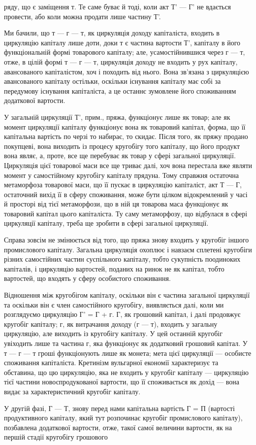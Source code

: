 ряду, що є заміщення т. Те саме буває й тоді, коли акт Т' — Г' не
вдається провести, або коли можна продати лише частину Т'.

Ми бачили, що т — г — т, як циркуляція доходу капіталіста, входить
в циркуляцію капіталу лише доти, доки т є частина вартости Т', капіталу
в його функціональній формі товарового капіталу; але, усамостійнившися
через г — т, отже, в цілій формі т — г — т, циркуляція доходу не входить
у рух капіталу, авансованого капіталістом, хоч і походить від нього.
Вона зв’язана з циркуляцією авансованого капіталу остільки, оскільки
існування капіталу має собі за передумову існування капіталіста, а це
останнє зумовлене його споживанням додаткової вартости.

У загальній циркуляції Т', прим., пряжа, функціонує лише як товар;
але як момент циркуляції капіталу функціонує вона як товаровий
капітал, форма, що її капітальна вартість по черзі то набирає, то скидає.
Після того, як пряжу продано покупцеві, вона виходить із процесу
кругобігу того капіталу, що його продукт вона являє, а, проте, все ще
перебуває як товар у сфері загальної циркуляції. Циркуляція цієї товарової
маси все ще триває далі, хоч вона перестала вже являти момент
у самостійному кругобігу капіталу прядуна. Тому справжня остаточна
метаморфоза товарової маси, що її пускає в циркуляцію капіталіст, акт
Т — Г, остаточний вихід її в сферу споживання, може бути цілком відокремлений
у часі й просторі від тієї метаморфози, що в ній ця товарова
маса функціонує як товаровий капітал цього капіталіста. Ту саму метаморфозу,
що відбулася в сфері циркуляції капіталу, треба ще зробити
в сфері загальної циркуляції.

Справа зовсім не змінюється від того, що пряжа знову входить
у кругобіг іншого промислового капіталу. Загальна циркуляція охоплює
і навзаєм сплетені кругобіги різних самостійних частин суспільного капіталу,
тобто сукупність поодиноких капіталів, і циркуляцію вартостей, поданих
на ринок не як капітал, тобто вартостей, що входять у сферу особистого
споживання.

Відношення між кругобігом капіталу, оскільки він є частина загальної
циркуляції та оскільки він є член самостійного кругобігу, виявляється
далі, коли ми розглядуємо циркуляцію Г' = Г + г. Г, як грошовий капітал,
і далі продовжує кругобіг капіталу; г, як витрачання доходу (г — т),
входить у загальну циркуляцію, але виходить із кругобігу капіталу. У цей
останній кругобіг увіходить лише та частина г, яка функціонує як додатковий
грошовий капітал. У т — г — т гроші функціонують лише як
монета; мета цієї циркуляції — особисте споживання капіталіста. Кретинізм
вульгарної економії характеризує та обставина, що цю циркуляцію, яка
не входить у кругобіг капіталу — циркуляцію тієї частини новоспродукованої
вартости, що її споживається як дохід — вона видає за характеристичний
кругобіг капіталу.

У другій фазі, Г — Т, знову перед нами капітальна вартість
Г = П (вартості продуктивного капіталу, який тут розпочинає кругобіг
промислового капіталу), позбавлена додаткової вартости, отже, такої
самої величини вартости, як на першій стадії кругобігу грошового
